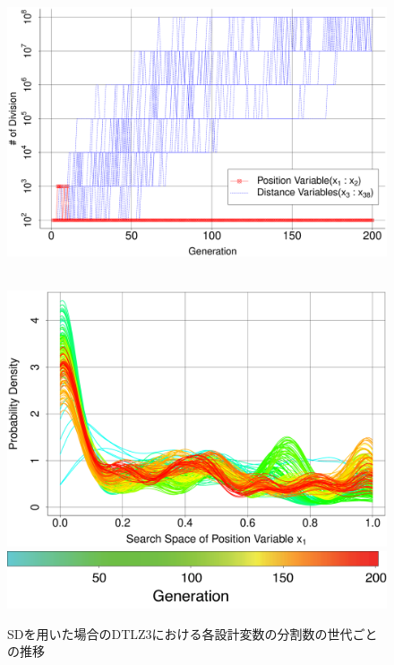 \documentclass[../main/main]{subfiles}
\begin{document}
\begin{figure}[!h]
\begin{minipage}{0.38\hsize}
\vspace{-0.2in}
\includegraphics[width=1\linewidth]{../figures/DTLZ3_digit_trend.eps}\\
\\
\caption{SDを用いた場合のDTLZ3における各設計変数の分割数の世代ごとの推移}
\label{digi_trans}
\end{minipage}
\begin{minipage}{0.61\hsize}
\begin{minipage}{0.49\hsize}
\includegraphics[width=1\linewidth]{../figures/DTLZ3_var1_pdf_trend.eps}\\
\centering
\hspace{0.2in} \includegraphics[width=0.8\linewidth]{../figures/color_bar.eps}

\end{minipage}
\end{minipage}
\end{figure}
\end{document}
